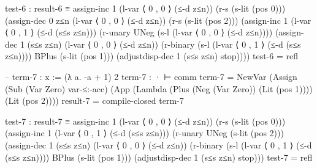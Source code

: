 \documentclass{article}
\begin{document}
\begin{prev}
\begin{code}
test-6 : result-6 ≡ 
    assign-inc 1 
    (l-var ⟨ 0 , 0 ⟩ (≤-d z≤n)) 
    (r-s (s-lit (pos 0)))
    (assign-dec 0 z≤n 
        (l-var ⟨ 0 , 0 ⟩ (≤-d z≤n)) 
        (r-s (s-lit (pos 2)))
        (assign-inc 1 
            (l-var ⟨ 0 , 1 ⟩ (≤-d (s≤s z≤n)))
            (r-unary UNeg (s-l (l-var ⟨ 0 , 0 ⟩ (≤-d z≤n))))
            (assign-dec 1 (s≤s z≤n) 
                (l-var ⟨ 0 , 0 ⟩ (≤-d z≤n))
                (r-binary 
                    (s-l (l-var ⟨ 0 , 1 ⟩ (≤-d (s≤s z≤n)))) 
                    BPlus
                    (s-lit (pos 1)))
                (adjustdisp-dec 1 (s≤s z≤n) stop))))
test-6 = refl


-- term-7 : x := (λ a. -a + 1) 2
term-7 : · ⊢ comm
term-7 = 
    NewVar 
        (Assign 
            (Sub (Var Zero) var-≤:-acc) 
            (App 
                (Lambda 
                    (Plus 
                        (Neg (Var Zero))
                        (Lit (pos 1)))) 
                (Lit (pos 2))))
result-7 = compile-closed term-7

test-7 : result-7 ≡
   assign-inc 1 
   (l-var ⟨ 0 , 0 ⟩ (≤-d z≤n)) 
   (r-s (s-lit (pos 0)))
    (assign-inc 1 
        (l-var ⟨ 0 , 1 ⟩ (≤-d (s≤s z≤n)))
        (r-unary UNeg (s-lit (pos 2)))
        (assign-dec 1 (s≤s z≤n) 
            (l-var ⟨ 0 , 0 ⟩ (≤-d z≤n))
            (r-binary 
                (s-l (l-var ⟨ 0 , 1 ⟩ (≤-d (s≤s z≤n)))) 
                BPlus
                (s-lit (pos 1)))
            (adjustdisp-dec 1 (s≤s z≤n) stop)))
test-7 = refl
\end{code}
\end{prev}
\end{document}

